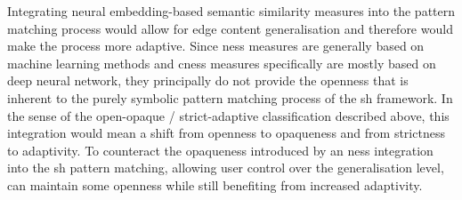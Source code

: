 \documentclass[11pt, numbers=noenddot]{scrreprt}
\begin{document}
Integrating neural embedding-based semantic similarity measures into the pattern matching process would allow for edge content generalisation and therefore would make the process more adaptive. Since \gls{ness} measures are generally based on machine learning methods and \gls{cness} measures specifically are mostly based on deep neural network, they principally do not provide the openness that is inherent to the purely symbolic pattern matching process of the \gls{sh} framework. In the sense of the open-opaque / strict-adaptive classification described above, this integration would mean a shift from openness to opaqueness and from strictness to adaptivity. To counteract the opaqueness introduced by an \gls{ness} integration into the \gls{sh} pattern matching, allowing user control over the generalisation level, can maintain some openness while still benefiting from increased adaptivity.




\end{document}
